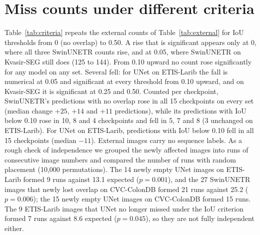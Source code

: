 \section{Miss counts under different criteria}
\label{app:criteria}
Table~\ref{tab:criteria} repeats the external counts of Table~\ref{tab:external} for IoU thresholds from 0 (no overlap) to 0.50. A rise that is significant appears only at 0, where all three SwinUNETR counts rise, and at 0.05, where SwinUNETR on Kvasir-SEG still does (125 to 144). From 0.10 upward no count rose significantly for any model on any set. Several fell: for UNet on ETIS-Larib the fall is numerical at 0.05 and significant at every threshold from 0.10 upward, and on Kvasir-SEG it is significant at 0.25 and 0.50. Counted per checkpoint, SwinUNETR's predictions with no overlap rose in all 15 checkpoints on every set (median change $+25$, $+14$ and $+11$ predictions), while its predictions with IoU below 0.10 rose in 10, 8 and 4 checkpoints and fell in 5, 7 and 8 (3 unchanged on ETIS-Larib). For UNet on ETIS-Larib, predictions with IoU below 0.10 fell in all 15 checkpoints (median $-11$). External images carry no sequence labels. As a rough check of independence we grouped the newly affected images into runs of consecutive image numbers and compared the number of runs with random placement (10,000 permutations). The 14 newly empty UNet images on ETIS-Larib formed 9 runs against 13.1 expected ($p=0.001$), and the 27 SwinUNETR images that newly lost overlap on CVC-ColonDB formed 21 runs against 25.2 ($p=0.006$); the 15 newly empty UNet images on CVC-ColonDB formed 15 runs. The 9 ETIS-Larib images that UNet no longer missed under the IoU criterion formed 7 runs against 8.6 expected ($p=0.045$), so they are not fully independent either.

